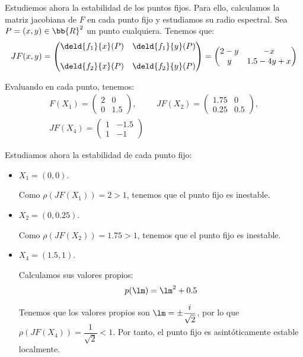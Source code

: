 \begin{ejercicio}
    Estudiemos ahora la estabilidad de los puntos fijos. Para ello,
    calculamos la matriz jacobiana de $F$ en cada punto fijo y estudiamos
    su radio espectral. Sea $P=(x,y)\in \bb{R}^2$ un punto cualquiera. Tenemos que:
    \begin{equation*}
        JF(x,y) = \begin{pmatrix}
            \deld{f_1}{x}(P) & \deld{f_1}{y}(P)\\ \\
            \deld{f_2}{x}(P) & \deld{f_2}{y}(P)
        \end{pmatrix}
        = \begin{pmatrix}
            2 - y & -x\\
            y & 1.5 - 4y + x
        \end{pmatrix}
    \end{equation*}

    Evaluando en cada punto, tenemos:
    \begin{gather*}
        F(X_1) = \begin{pmatrix}
            2 & 0\\
            0 & 1.5
        \end{pmatrix},\hspace{1cm}
        JF(X_2) = \begin{pmatrix}
            1.75 & 0\\
            0.25 & 0.5
        \end{pmatrix},\\
        JF(X_4) = \begin{pmatrix}
            1 & -1.5\\
            1 & -1
        \end{pmatrix}
    \end{gather*}

    Estudiamos ahora la estabilidad de cada punto fijo:
    \begin{itemize}
        \item $X_1=(0,0)$.
        
        Como $\rho(JF(X_1)) = 2>1$, tenemos que el punto fijo es inestable.

        \item $X_2=(0,0.25)$.
        
        Como $\rho(JF(X_2)) = 1.75>1$, tenemos que el punto fijo es inestable.

        \item $X_4=(1.5,1)$.
        
        Calculamos sus valores propios:
        \begin{equation*}
            p(\lm) = \lm^2 + 0.5
        \end{equation*}

        Tenemos que los valores propios son $\lm=\pm \dfrac{i}{\sqrt{2}}$, por lo que $\rho(JF(X_4)) = \dfrac{1}{\sqrt{2}} < 1$. Por tanto, el punto fijo es asintóticamente estable localmente.
    \end{itemize}
\end{ejercicio}
